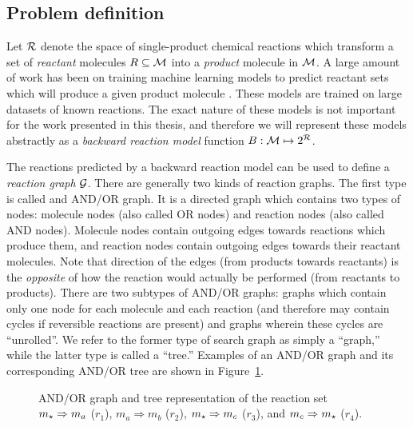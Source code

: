 \subsection{Problem definition}

Let $\mathcal{R}$ denote the space of single-product chemical reactions
which transform a set of \emph{reactant} molecules $R\subseteq\mathcal{M}$
into a
\emph{product} molecule in $\mathcal{M}$.
A large amount of work has been on training machine learning models
to predict reactant sets
which will produce a given product molecule
\citep{segler2017neural,dai2019retrosynthesis,%
seidl2021modern,chen2021deep,sacha2021molecule,irwin2022chemformer,%
zhong2022root,liu2023fusionretro}.
These models are trained on large datasets of known reactions.
The exact nature of these models is not important for the work presented in this thesis,
and therefore we will represent these models abstractly as
a \emph{backward reaction model} function $B:{\mathcal{M}}\mapsto 2^{\mathcal{R}}$.

The reactions predicted by a backward reaction model can be used to define
a \emph{reaction graph} ${\mathcal{G}}$.
There are generally two kinds of reaction graphs.
The first type is called and AND/OR graph.
It is a directed graph which contains two types of nodes:
molecule nodes (also called OR nodes)
and reaction nodes (also called AND nodes).
Molecule nodes contain outgoing edges towards reactions which produce them,
and reaction nodes contain outgoing edges towards their reactant molecules.
Note that direction of the edges (from products towards reactants)
is the \emph{opposite} of how the reaction would actually be performed
(from reactants to products).
There are two subtypes of AND/OR graphs:
graphs which contain only one node for each molecule and each reaction
(and therefore may contain cycles if reversible reactions are present)
and graphs wherein these cycles are ``unrolled''.
We refer to the former type of search graph as simply a ``graph,''
while the latter type is called a ``tree.''
Examples of an AND/OR graph
and its corresponding
AND/OR tree are shown in Figure~\ref{fig:graphs-vs-trees-schematic}.

\begin{figure}[ht]
    \centering
    
    \caption[Example of an AND/OR graph and tree.]{
        AND/OR graph and tree representation of the reaction set
        $m_\star\Rightarrow m_a$ ($r_1$),
        $m_a\Rightarrow m_b$ ($r_2$),
        $m_\star\Rightarrow m_c$ ($r_3$),
        and
        $m_c\Rightarrow m_\star$ ($r_4$).
    }
    \label{fig:graphs-vs-trees-schematic}
\end{figure}

